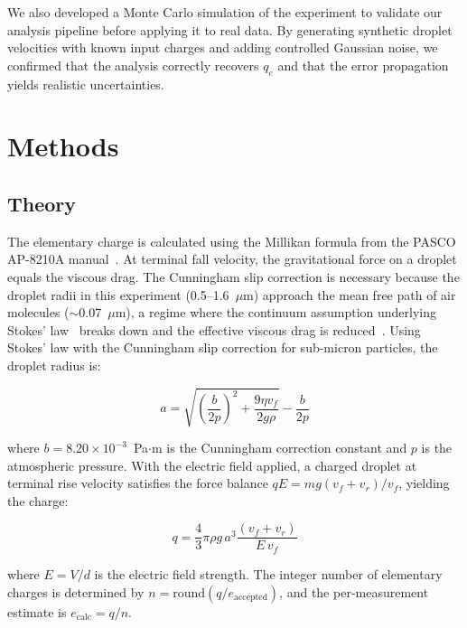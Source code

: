 \documentclass[%
 reprint,
 amsmath,amssymb,
 aps,
]{revtex4-2}
\begin{document}
We also developed a Monte Carlo simulation of the experiment to validate our analysis pipeline before applying it to real data. By generating synthetic droplet velocities with known input charges and adding controlled Gaussian noise, we confirmed that the analysis correctly recovers \(q_e\) and that the error propagation yields realistic uncertainties.

\section{Methods}

\subsection{Theory}

The elementary charge is calculated using the Millikan formula from the PASCO AP-8210A manual~\cite{PASCO-AP8210A}. At terminal fall velocity, the gravitational force on a droplet equals the viscous drag. The Cunningham slip correction is necessary because the droplet radii in this experiment (0.5--1.6~$\mu$m) approach the mean free path of air molecules ($\sim$0.07~$\mu$m), a regime where the continuum assumption underlying Stokes' law~\cite{Stokes1851} breaks down and the effective viscous drag is reduced~\cite{Cunningham1910}. Using Stokes' law with the Cunningham slip correction for sub-micron particles, the droplet radius is:

\begin{equation}
    a = \sqrt{\left(\frac{b}{2p}\right)^{2} + \frac{9 \eta v_f}{2 g \rho}} - \frac{b}{2p}
\end{equation}

where $b = 8.20 \times 10^{-3}$~Pa$\cdot$m is the Cunningham correction constant and $p$ is the atmospheric pressure. With the electric field applied, a charged droplet at terminal rise velocity satisfies the force balance $qE = mg(v_f + v_r)/v_f$, yielding the charge:

\begin{equation}
    q = \frac{4}{3} \pi \rho g\, a^{3} \frac{(v_f + v_r)}{E\, v_f}
\end{equation}

where $E = V/d$ is the electric field strength. The integer number of elementary charges is determined by $n = \text{round}(q / e_{\text{accepted}})$, and the per-measurement estimate is $e_{\text{calc}} = q / n$.
\end{document}
